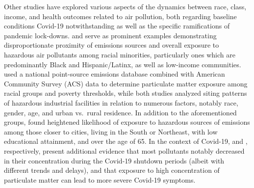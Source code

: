 \documentclass[12pt, ]{article}
\begin{document}
Other studies have explored various aspects of the dynamics between
race, class, income, and health outcomes related to air pollution, both
regarding baseline conditions Covid-19 notwithstanding as well as the
specific ramifications of pandemic lock-downs.
\citet{mikati_disparities_2018} and \citet{mohai_racial_2009} serve as
prominent examples demonstrating disproportionate proximity of emissions
sources and overall exposure to hazardous air pollutants among racial
minorities, particularly ones which are predominantly Black and
Hispanic/Latinx, as well as low-income communities.
\citet{mikati_disparities_2018} used a national point-source emissions
database combined with American Community Survey (ACS) data to determine
particulate matter exposure among racial groups and poverty thresholds,
while both studies analyzed siting patterns of hazardous industrial
facilities in relation to numerous factors, notably race, gender, age,
and urban vs.~rural residence. In addition to the aforementioned groups,
\citet{mohai_racial_2009} found heightened likelihood of exposure to
hazardous sources of emissions among those closer to cities, living in
the South or Northeast, with low educational attainment, and over the
age of 65. In the context of Covid-19, \citet{bekbulat_changes_2021} and
\citet{ali_exposure_2021}, respectively, present additional evidence
that most pollutants notably decreased in their concentration during the
Covid-19 shutdown periods (albeit with different trends and delays), and
that exposure to high concentration of particulate matter can lead to
more severe Covid-19 symptoms.
\end{document}
